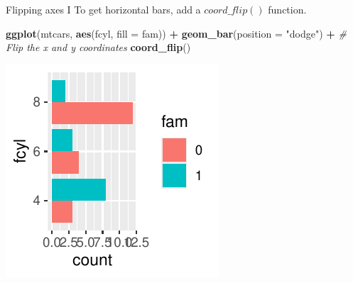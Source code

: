 \documentclass[
  ignorenonframetext,
]{beamer}
\newenvironment{Shaded}{\begin{snugshade}}{\end{snugshade}}
\newcommand{\AttributeTok}[1]{\textcolor[rgb]{0.13,0.29,0.53}{#1}}
\newcommand{\CommentTok}[1]{\textcolor[rgb]{0.56,0.35,0.01}{\textit{#1}}}
\newcommand{\FunctionTok}[1]{\textcolor[rgb]{0.13,0.29,0.53}{\textbf{#1}}}
\newcommand{\NormalTok}[1]{#1}
\newcommand{\SpecialCharTok}[1]{\textcolor[rgb]{0.81,0.36,0.00}{\textbf{#1}}}
\newcommand{\StringTok}[1]{\textcolor[rgb]{0.31,0.60,0.02}{#1}}
\begin{document}
\begin{frame}[fragile]{Flipping axes I}
\label{flipping-axes-i-3}
To get horizontal bars, add a \(coord\_flip()\) function.


\begin{Shaded}
\begin{Highlighting}[]
\FunctionTok{ggplot}\NormalTok{(mtcars, }\FunctionTok{aes}\NormalTok{(fcyl, }\AttributeTok{fill =}\NormalTok{ fam)) }\SpecialCharTok{+}
  \FunctionTok{geom\_bar}\NormalTok{(}\AttributeTok{position =} \StringTok{"dodge"}\NormalTok{) }\SpecialCharTok{+} \CommentTok{\# Flip the x and y coordinates}
  \FunctionTok{coord\_flip}\NormalTok{()}
\end{Highlighting}
\end{Shaded}

\begin{center}\includegraphics[width=0.5\linewidth]{Figs/unnamed-chunk-60-1} \end{center}
\end{frame}
\end{document}
